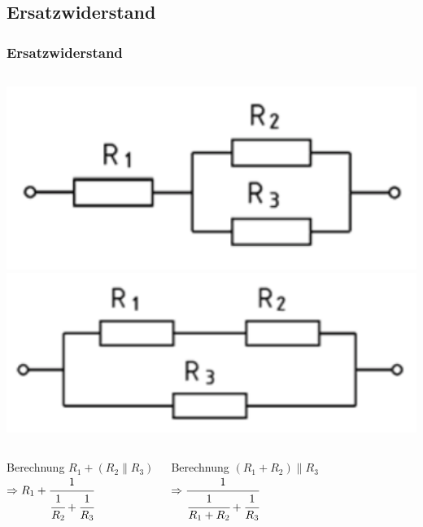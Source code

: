 \subsection{Ersatzwiderstand}
\begin{frame}
  \frametitle{Ersatzwiderstand}
  \begin{columns}
    \includegraphics[width=1\textwidth]{e04/Ersatzwiderstand1.png}
    \includegraphics[width=1\textwidth]{e04/Ersatzwiderstand2.png}
  \end{columns}
  \begin{columns}
    \pause
    \begin{exampleblock}{Berechnung}
      $R_1 + (R_2 \parallel R_3)$ \\[1.5em]
      $\Rightarrow R_1 + \cfrac{1}{\cfrac{1}{R_2} + \cfrac{1}{R_3}}$
    \end{exampleblock}
    \pause
    \begin{exampleblock}{Berechnung}
      $(R_1 + R_2) \parallel R_3$\\[1.5em]
      $\Rightarrow \cfrac{1}{\cfrac{1}{R_1 + R_2} + \cfrac{1}{R_3}}$
    \end{exampleblock}
  \end{columns}
\end{frame}

